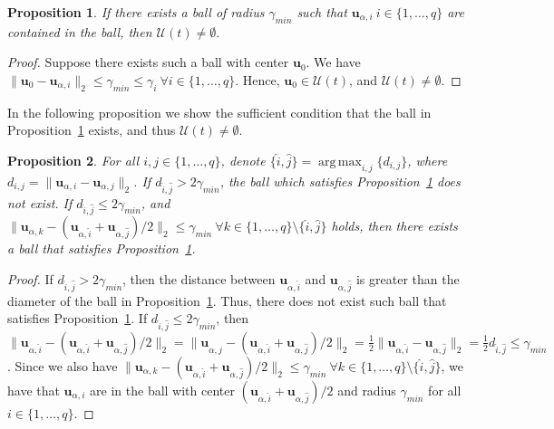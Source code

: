 \documentclass[journal]{IEEEtran}
\DeclareMathOperator*{\argmax}{arg\,max}
\newtheorem{proposition}{Proposition}
\begin{document}
\begin{proposition}
\label{prop:no_conflict}
If there exists a ball of radius $\gamma_{min}$ such that $\mathbf{u}_{\alpha,i} \ i \in \{1,\ldots,q\}$ are contained in the ball, then $\mathcal{U}(t) \neq \emptyset.$
\end{proposition}

\begin{proof}
Suppose there exists such a ball with center $\mathbf{u}_0$. We have $\|\mathbf{u}_0 - \mathbf{u}_{\alpha,i}\|_2 \leq \gamma_{min} \leq \gamma_{i} \ \forall i \in \{1,\ldots,q\}$. Hence, $\mathbf{u}_0 \in \mathcal{U}(t)$, and $\mathcal{U}(t) \neq \emptyset.$
\end{proof}

In the following proposition we show the sufficient condition that the ball in Proposition~\ref{prop:no_conflict} exists, and thus $\mathcal{U}(t) \neq \emptyset$.

\begin{proposition}
\label{prop:ball_exist}
For all $i,j \in \{1,\ldots,q\}$, denote $\{\hat{i}, \hat{j}\} = \argmax_{i,j} \{d_{i,j}\}$, where $d_{i,j} = \|\mathbf{u}_{\alpha,i}-\mathbf{u}_{\alpha,j}\|_2$. If $d_{\hat{i}, \hat{j}} > 2\gamma_{min}$, the ball which satisfies Proposition~\ref{prop:no_conflict} does not exist. If $d_{\hat{i}, \hat{j}} \leq 2\gamma_{min}$, and $\|\mathbf{u}_{\alpha,k} - (\mathbf{u}_{\alpha,\hat{i}} + \mathbf{u}_{\alpha,\hat{j}})/2\|_2 \leq \gamma_{min} \ \forall k \in \{1,\ldots,q\} \setminus \{\hat{i}, \hat{j}\}$ holds, then there exists a ball that satisfies Proposition~\ref{prop:no_conflict}.
\end{proposition}
 
\begin{proof}
If $d_{\hat{i}, \hat{j}} > 2\gamma_{min}$, then the distance between $\mathbf{u}_{\alpha,\hat{i}}$ and $\mathbf{u}_{\alpha,\hat{j}}$ is greater than the diameter of the ball in Proposition~\ref{prop:no_conflict}. Thus, there does not exist such ball that satisfies Proposition~\ref{prop:no_conflict}. If $d_{\hat{i}, \hat{j}} \leq 2\gamma_{min}$, then $\|\mathbf{u}_{\alpha,\hat{i}} - (\mathbf{u}_{\alpha,\hat{i}} + \mathbf{u}_{\alpha,\hat{j}})/2\|_2 = \|\mathbf{u}_{\alpha,\hat{j}} - (\mathbf{u}_{\alpha,\hat{i}} + \mathbf{u}_{\alpha,\hat{j}})/2\|_2 = \frac{1}{2}\|\mathbf{u}_{\alpha,\hat{i}} - \mathbf{u}_{\alpha,\hat{j}}\|_2 = \frac{1}{2}d_{\hat{i}, \hat{j}} \leq \gamma_{min}$. Since we also have $\|\mathbf{u}_{\alpha,k} - (\mathbf{u}_{\alpha,\hat{i}} + \mathbf{u}_{\alpha,\hat{j}})/2\|_2 \leq \gamma_{min} \ \forall k \in \{1,\ldots,q\} \setminus \{\hat{i}, \hat{j}\}$, we have that $\mathbf{u}_{\alpha,i}$ are in the ball with center $(\mathbf{u}_{\alpha,\hat{i}} + \mathbf{u}_{\alpha,\hat{j}})/2$ and radius $\gamma_{min}$ for all $i \in \{1,\ldots,q\}$.
\end{proof}
\end{document}
